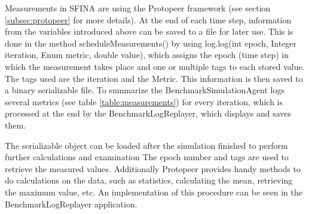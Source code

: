 \documentclass[11pt,fleqn]{book} %
\newcommand{\BenchmarkAgent}{BenchmarkSimulationAgent}
\newcommand{\BenchmarkLogReplayer}{BenchmarkLogReplayer}
\begin{document}
Measurements in SFINA are using the Protopeer framework (see section \ref{subsec:protopeer} for more details). At the end of each time step, information from the variables introduced above can be saved to a file for later use. This is done in the method scheduleMeasurements() by using log.log(int epoch, Integer iteration, Enum metric, double value), which assigns the epoch (time step) in which the measurement takes place and one or multiple tags to each stored value. The tags used are the iteration and the Metric. This information is then saved to a binary serializable file. To summarize the \BenchmarkAgent{} logs several metrics (see table \ref{table:measurements}) for every iteration, which is processed at the end by the \BenchmarkLogReplayer{}, which displays and saves them.

The serializable object can be loaded after the simulation finished to perform further calculations and examination The epoch number and tags are used to retrieve the measured values. Additionally Protopeer provides handy methods to do calculations on the data, such as statistics, calculating the mean, retrieving the maximum value, etc. An implementation of this procedure can be seen in the \BenchmarkLogReplayer{} application.
\end{document}
